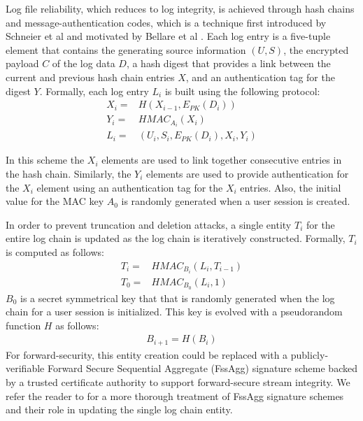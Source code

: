 \documentclass{sig-alternate}
\begin{document}
Log file reliability, which reduces to log integrity, is achieved through hash chains and message-authentication codes, 
which is a technique first introduced by Schneier et al \cite{Schneier1999-Secure} and motivated by
Bellare et al \cite{Bellare1997-ForwardIntegrity}. 
Each log entry is a five-tuple element that contains the generating source
information $(U, S)$, the encrypted payload $C$ of the log data $D$, a hash digest that provides
a link between the current and previous hash chain entries $X$, and an authentication tag for the digest $Y$. 
Formally, each log entry $L_i$ is built using the following protocol: %
\begin{align*}
X_i = & H(X_{i - 1}, E_{PK}(D_i)) \\ %
Y_i = & HMAC_{A_i}(X_i) \\ 
L_i = & (U_{i}, S_{i}, E_{PK}(D_i), X_i, Y_i) %
\end{align*}


In this scheme the $X_i$ elements are used to link together consecutive entries in 
the hash chain. Similarly, the $Y_i$ elements are used to provide authentication 
for the $X_i$ element using an authentication tag for the $X_i$ entries. Also, the 
initial value for the MAC key $A_0$ is randomly generated when a user session is 
created. 

In order to prevent truncation and deletion attacks, a single entity $T_i$ for the entire log 
chain is updated as the log chain is iteratively constructed. Formally, $T_i$ is
computed as follows:
\begin{align*}
T_i = & HMAC_{B_i}(L_{i}, T_{i - 1}) \\
T_0 = & HMAC_{B_0}(L_{i}, 1)
\end{align*}
$B_0$ is a secret symmetrical key that that is randomly generated when the log chain for a user session
is initialized. This key is evolved with a pseudorandom function $H$ as follows:
\begin{align*}
B_{i+1} = H(B_i)
\end{align*}
For forward-security, this entity creation could be replaced with a publicly-verifiable Forward Secure Sequential Aggregate (FssAgg)
signature scheme backed by a trusted certificate authority to support forward-secure stream integrity. We refer the reader to 
\cite{Ma2008-FssAgg} for a more thorough treatment of FssAgg signature schemes and their role in updating the single log chain entity. 
\end{document}
